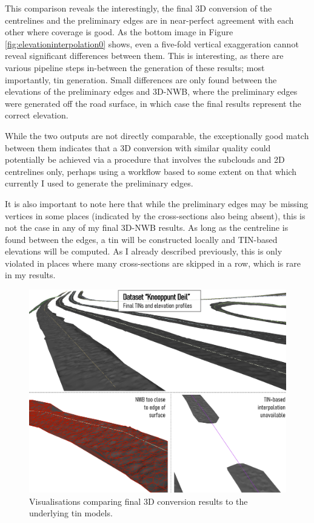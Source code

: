 This comparison reveals the interestingly, the final 3D conversion of the centrelines and the preliminary edges are in near-perfect agreement with each other where coverage is good. As the bottom image in Figure \ref{fig:elevationinterpolation0} shows, even a five-fold vertical exaggeration cannot reveal significant differences between them. This is interesting, as there are various pipeline steps in-between the generation of these results; most importantly, \ac{tin} generation. Small differences are only found between the elevations of the preliminary edges and 3D-NWB, where the preliminary edges were generated off the road surface, in which case the final results represent the correct elevation.

While the two outputs are not directly comparable, the exceptionally good match between them indicates that a 3D conversion with similar quality could potentially be achieved via a procedure that involves the subclouds and 2D centrelines only, perhaps using a workflow based to some extent on that which currently I used to generate the preliminary edges.

It is also important to note here that while the preliminary edges may be missing vertices in some places (indicated by the cross-sections also being absent), this is not the case in any of my final 3D-NWB results. As long as the centreline is found between the edges, a \ac{tin} will be constructed locally and TIN-based elevations will be computed. As I already described previously, this is only violated in places where many cross-sections are skipped in a row, which is rare in my results.

\begin{figure}[h]
    \centering
    \includegraphics[width=0.9\linewidth]{final_report/figs/elevationinterpolation1.png}
    \caption{Visualisations comparing final 3D conversion results to the underlying \ac{tin} models.}
    \label{fig:elevationinterpolation1}
\end{figure}

